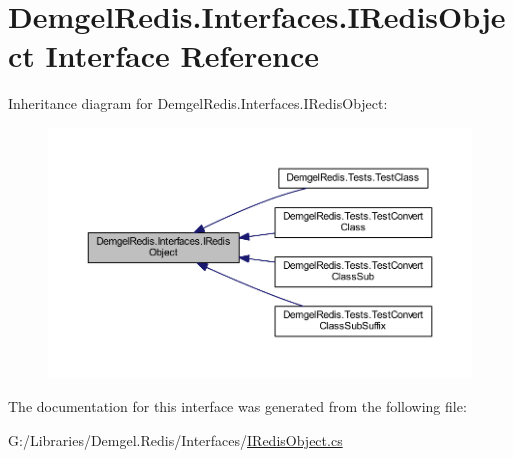 \hypertarget{interface_demgel_redis_1_1_interfaces_1_1_i_redis_object}{}\section{Demgel\+Redis.\+Interfaces.\+I\+Redis\+Object Interface Reference}
\label{interface_demgel_redis_1_1_interfaces_1_1_i_redis_object}


Inheritance diagram for Demgel\+Redis.\+Interfaces.\+I\+Redis\+Object\+:
\nopagebreak
\begin{figure}[H]
\begin{center}
\leavevmode
\includegraphics[width=350pt]{interface_demgel_redis_1_1_interfaces_1_1_i_redis_object__inherit__graph}
\end{center}
\end{figure}


The documentation for this interface was generated from the following file\+:\begin{DoxyCompactItemize}
\item 
G\+:/\+Libraries/\+Demgel.\+Redis/\+Interfaces/\hyperlink{_i_redis_object_8cs}{I\+Redis\+Object.\+cs}\end{DoxyCompactItemize}
